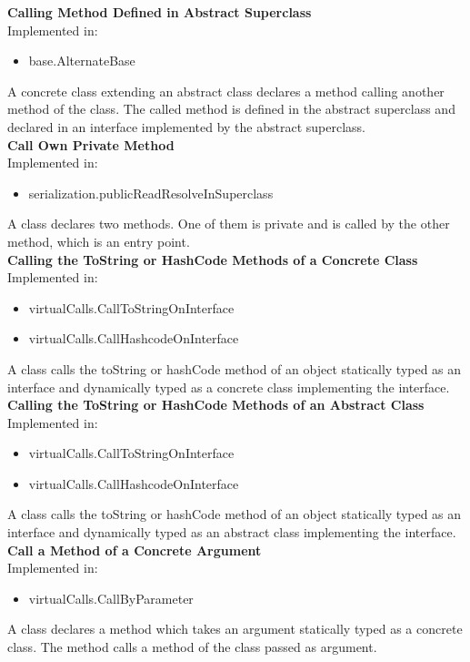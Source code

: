 \documentclass{article}
\begin{document}
\textbf{Calling Method Defined in Abstract Superclass}\\
Implemented in: 
\begin{itemize}
    \item base.AlternateBase
\end{itemize}
A concrete class extending an abstract class declares a method calling another method of the class. The called method is defined in the abstract superclass and declared in an interface implemented by the abstract superclass.\\

\noindent
\textbf{Call Own Private Method}\\
Implemented in: 
\begin{itemize}
    \item serialization.publicReadResolveInSuperclass
\end{itemize}
A class declares two methods. One of them is private and is called by the other method, which is an entry point.\\

\noindent
\textbf{Calling the ToString or HashCode Methods of a Concrete Class}\\
Implemented in: 
\begin{itemize}
    \item virtualCalls.CallToStringOnInterface
    \item virtualCalls.CallHashcodeOnInterface
\end{itemize}
A class calls the toString or hashCode method of an object statically typed as an interface and dynamically typed as a concrete class implementing the interface.\\

\noindent
\textbf{Calling the ToString or HashCode Methods of an Abstract Class}\\
Implemented in: 
\begin{itemize}
    \item virtualCalls.CallToStringOnInterface
    \item virtualCalls.CallHashcodeOnInterface
\end{itemize}
A class calls the toString or hashCode method of an object statically typed as an interface and dynamically typed as an abstract class implementing the interface.\\

\noindent
\textbf{Call a Method of a Concrete Argument}\\
Implemented in: 
\begin{itemize}
    \item virtualCalls.CallByParameter
\end{itemize}
A class declares a method which takes an argument statically typed as a concrete class. The method calls a method of the class passed as argument.\\
\end{document}
